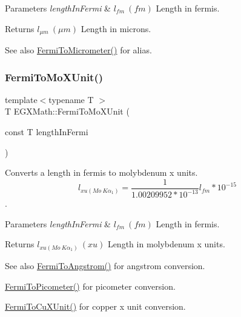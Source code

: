 \begin{DoxyParams}{Parameters}
{\em length\+In\+Fermi} & $ l_{fm}\ (fm)$ Length in fermis. \\
\hline
\end{DoxyParams}
\begin{DoxyReturn}{Returns}
$ l_{\mu m}\ (\mu m)$ Length in microns. 
\end{DoxyReturn}
\begin{DoxySeeAlso}{See also}
\mbox{\hyperlink{group___e_g_x_math-_conversions-_length_conversions-_non-_s_i-_fermi-_s_i_ga3e8b4a4bff215efda3d05329d6a823db}{Fermi\+To\+Micrometer()}} for alias. 
\end{DoxySeeAlso}
\mbox{\label{group___e_g_x_math-_conversions-_length_conversions-_non-_s_i-_fermi-_non-_s_i_ga8555a46e14c4a759e0b04a54485d679e}} 
\subsubsection{\texorpdfstring{Fermi\+To\+Mo\+X\+Unit()}{FermiToMoXUnit()}}
{\footnotesize\ttfamily template$<$typename T $>$ \\
T E\+G\+X\+Math\+::\+Fermi\+To\+Mo\+X\+Unit (\begin{DoxyParamCaption}\item[{const T}]{length\+In\+Fermi }\end{DoxyParamCaption})}



Converts a length in fermis to molybdenum x units. \[ l_{xu(Mo\ K\alpha_1)}=\frac{1}{1.00209952*10^{-13}} l_{fm} * 10^{-15}\]. 


\begin{DoxyParams}{Parameters}
{\em length\+In\+Fermi} & $ l_{fm}\ (fm)$ Length in fermis. \\
\hline
\end{DoxyParams}
\begin{DoxyReturn}{Returns}
$ l_{xu(Mo\ K\alpha_1)}\ (xu)$ Length in molybdenum x units. 
\end{DoxyReturn}
\begin{DoxySeeAlso}{See also}
\mbox{\hyperlink{group___e_g_x_math-_conversions-_length_conversions-_non-_s_i-_fermi-_non-_s_i_ga9bec1d5936dfd3fa360cf3484685cc23}{Fermi\+To\+Angstrom()}} for angstrom conversion. 

\mbox{\hyperlink{group___e_g_x_math-_conversions-_length_conversions-_non-_s_i-_fermi-_s_i_ga9d12cf46e802908b3ee6f6e1c4d8047e}{Fermi\+To\+Picometer()}} for picometer conversion. 

\mbox{\hyperlink{group___e_g_x_math-_conversions-_length_conversions-_non-_s_i-_fermi-_non-_s_i_ga8c0963430e8fec7c613543844bd80064}{Fermi\+To\+Cu\+X\+Unit()}} for copper x unit conversion. 
\end{DoxySeeAlso}
